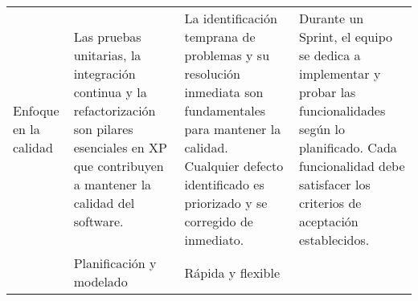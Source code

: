 \begin{longtable}{|p{2.5cm}|p{3cm}|p{3cm}|p{3cm}|}
    Enfoque en la calidad                          & Las pruebas unitarias, la integración continua y la refactorización son pilares esenciales en XP que contribuyen a mantener la calidad del software.                & La identificación temprana de problemas y su resolución inmediata son fundamentales para mantener la calidad. Cualquier defecto identificado es priorizado y se corregido de inmediato. & Durante un Sprint, el equipo se dedica a implementar y probar las funcionalidades según lo planificado. Cada funcionalidad debe satisfacer los criterios de aceptación establecidos. \\                                                                                                                                           & Planificación y modelado                                                                                                                                        & Rápida y flexible                                                                                                                  \\
\end{longtable}